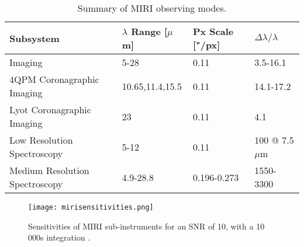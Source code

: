 \begin{table}[t]
	\begin{footnotesize}
	\centering
	\begin{tabular}{l|lll}
		\toprule
		\textbf{Subsystem} & \textbf{$\lambda$ Range [$\mu$m]} & \textbf{Px Scale ["/px]} & $\Delta\lambda/\lambda$\\
		\midrule
		Imaging & 5-28 & 0.11 & 3.5-16.1\\
		4QPM Coronagraphic Imaging & 10.65,11.4,15.5 & 0.11 & 14.1-17.2\\
		Lyot Coronagraphic Imaging & 23 & 0.11 & 4.1\\
		Low Resolution Spectroscopy & 5-12 & 0.11 & 100 @ 7.5$\mu$m\\
		Medium Resolution Spectroscopy & 4.9-28.8 & 0.196-0.273 & 1550-3300 \\
		\bottomrule
	\end{tabular}
	\caption{Summary of MIRI observing modes.}
	\label{tab:mirimodes}
	\end{footnotesize}
\end{table}
\begin{figure}[h]
	\centering
	\texttt{[image: mirisensitivities.png]}
	\caption{Sensitivities of MIRI sub-instruments for an SNR of 10, with a 10 000s integration \parencite{MIRI1}.}
	\label{fig:sensitivities}
\end{figure}
